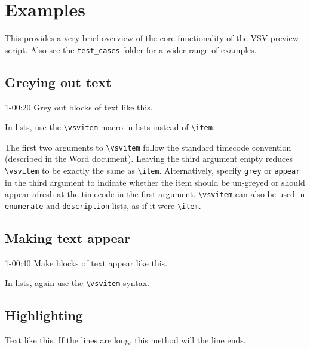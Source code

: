 


\section*{Examples}

This provides a very brief overview of the core functionality of the VSV preview script.
Also see the \verb=test_cases= folder for a wider range of examples.

\subsection*{Greying out text}
\begin{vsvgrey}{}{1-00:20}
Grey out blocks of text like this.
\end{vsvgrey}

\begin{itemize}
In lists, use the \verb=\vsvitem= macro in lists instead of \verb=\item=.
\end{itemize}

The first two arguments to \verb=\vsvitem= follow the standard timecode convention (described in the Word document).
Leaving the third argument empty reduces \verb=\vsvitem= to be exactly the same as \verb=\item=.
Alternatively, specify \verb=grey= or \verb=appear= in the third argument to indicate whether the item should be un-greyed or should appear afresh at the timecode in the first argument.
\verb=\vsvitem= can also be used in \verb=enumerate= and \verb=description= lists, as if it were \verb=\item=.

\subsection*{Making text appear}
\begin{vsvappear}{1-00:40}{}
Make blocks of text appear like this.
\end{vsvappear}

\begin{itemize}
In lists, again use the \verb=\vsvitem= syntax.
\end{itemize}

\subsection*{Highlighting}
Text  like this.
If the lines are long, this method will  the line ends.

